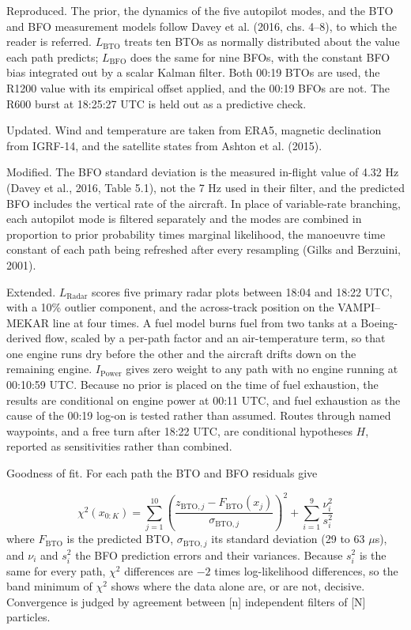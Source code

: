 Reproduced. The prior, the dynamics of the five autopilot modes, and the BTO and BFO measurement models follow Davey et al. (2016, chs. 4--8), to which the reader is referred. $L_{\mathrm{BTO}}$ treats ten BTOs as normally distributed about the value each path predicts; $L_{\mathrm{BFO}}$ does the same for nine BFOs, with the constant BFO bias integrated out by a scalar Kalman filter. Both 00:19 BTOs are used, the R1200 value with its empirical offset applied, and the 00:19 BFOs are not. The R600 burst at 18:25:27 UTC is held out as a predictive check.

Updated. Wind and temperature are taken from ERA5, magnetic declination from IGRF-14, and the satellite states from Ashton et al. (2015).

Modified. The BFO standard deviation is the measured in-flight value of 4.32 Hz (Davey et al., 2016, Table 5.1), not the 7 Hz used in their filter, and the predicted BFO includes the vertical rate of the aircraft. In place of variable-rate branching, each autopilot mode is filtered separately and the modes are combined in proportion to prior probability times marginal likelihood, the manoeuvre time constant of each path being refreshed after every resampling (Gilks and Berzuini, 2001).

Extended. $L_{\mathrm{Radar}}$ scores five primary radar plots between 18:04 and 18:22 UTC, with a 10\% outlier component, and the across-track position on the VAMPI--MEKAR line at four times. A fuel model burns fuel from two tanks at a Boeing-derived flow, scaled by a per-path factor and an air-temperature term, so that one engine runs dry before the other and the aircraft drifts down on the remaining engine. $I_{\mathrm{Power}}$ gives zero weight to any path with no engine running at 00:10:59 UTC. Because no prior is placed on the time of fuel exhaustion, the results are conditional on engine power at 00:11 UTC, and fuel exhaustion as the cause of the 00:19 log-on is tested rather than assumed. Routes through named waypoints, and a free turn after 18:22 UTC, are conditional hypotheses $H$, reported as sensitivities rather than combined.

Goodness of fit. For each path the BTO and BFO residuals give

\begin{equation}
\chi^{2}\left(x_{0:K}\right) = \sum_{j=1}^{10} \left(\frac{z_{\mathrm{BTO},j} - F_{\mathrm{BTO}}\left(x_{j}\right)}{\sigma_{\mathrm{BTO},j}}\right)^{2} + \sum_{i=1}^{9} \frac{\nu_{i}^{2}}{s_{i}^{2}}
\label{eq:31B-4}
\end{equation}
where $F_{\mathrm{BTO}}$ is the predicted BTO, $\sigma_{\mathrm{BTO},j}$ its standard deviation (29 to 63 $\mu$s), and $\nu_i$ and $s_i^2$ the BFO prediction errors and their variances. Because $s_i^2$ is the same for every path, $\chi^2$ differences are $-2$ times log-likelihood differences, so the band minimum of $\chi^2$ shows where the data alone are, or are not, decisive. Convergence is judged by agreement between [n] independent filters of [N] particles.
